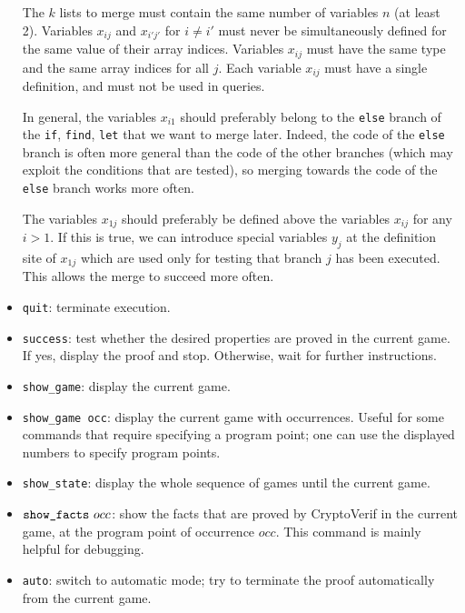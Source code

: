 \documentclass{article}
\begin{document}
\begin{itemize}
  The $k$ lists to merge must contain the same number of variables $n$
  (at least 2). Variables $x_{ij}$ and $x_{i'j'}$ for $i \neq i'$ must
  never be simultaneously defined for the same value of their array
  indices.  Variables $x_{ij}$ must have the same type and the same
  array indices for all $j$. Each variable $x_{ij}$ must have a single
  definition, and must not be used in queries.

  In general, the variables $x_{i1}$ should preferably belong to the
  \texttt{else} branch of the {\tt if}, {\tt find}, {\tt let} that we
  want to merge later. Indeed, the code of the {\tt else} branch is
  often more general than the code of the other branches (which may
  exploit the conditions that are tested), so merging towards the code
  of the {\tt else} branch works more often.

  The variables $x_{1j}$ should preferably be defined above the
  variables $x_{ij}$ for any $i > 1$. If this is true, we can
  introduce special variables $y_j$ at the definition site of $x_{1j}$
  which are used only for testing that branch $j$ has been executed.
  This allows the merge to succeed more often.

\item \texttt{quit}: terminate execution.

\item \texttt{success}: test whether the desired properties are
proved in the current game. If yes, display the proof and stop.
Otherwise, wait for further instructions.

\item \texttt{show\string_game}: display the current game.

\item \texttt{show\string_game occ}: display the current game with
  occurrences. Useful for some commands that require specifying a
  program point; one can use the displayed numbers to specify program
  points.

\item \texttt{show\string_state}: display the whole sequence
of games until the current game.

\item $\texttt{show\string_facts}\ occ$: show the facts that are proved
by CryptoVerif in the current game, at the program point of occurrence $occ$. 
This command is mainly helpful for debugging.

\item \texttt{auto}: switch to automatic mode; try to
terminate the proof automatically from the current game.


\end{itemize}
\end{document}
